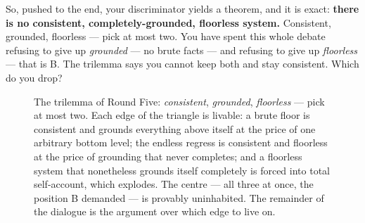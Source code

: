 \documentclass[fontsize=11pt,paper=a4,pagesize=auto,parskip=half-]{scrbook}
\begin{document}
So, pushed to the end, your discriminator yields a theorem, and it is exact: \textbf{there is no consistent, completely-grounded, floorless system.} Consistent, grounded, floorless --- pick at most two. You have spent this whole debate refusing to give up \emph{grounded} --- no brute facts --- and refusing to give up \emph{floorless} --- that is B. The trilemma says you cannot keep both and stay consistent. Which do you drop?


\begin{figure}[htbp]
\centering
{}
\caption{The trilemma of Round Five: \emph{consistent}, \emph{grounded}, \emph{floorless} --- pick at most two. Each edge of the triangle is livable: a brute floor is consistent and grounds everything above itself at the price of one arbitrary bottom level; the endless regress is consistent and floorless at the price of grounding that never completes; and a floorless system that nonetheless grounds itself completely is forced into total self-account, which explodes. The centre --- all three at once, the position B demanded --- is provably uninhabited. The remainder of the dialogue is the argument over which edge to live on.}
\label{fig:picktwo}
\end{figure}
\end{document}
